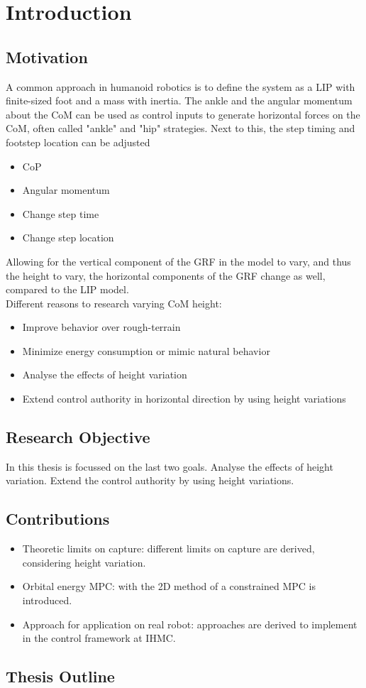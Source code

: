%
\chapter{Introduction} \label{chap::intro}
\section{Motivation}
A common approach in humanoid robotics is to define the system as a \ac{LIP} with finite-sized foot and a mass with inertia. The ankle and the angular momentum about the \ac{CoM} can be used as control inputs to generate horizontal forces on the \ac{CoM}, often called "ankle" and "hip" strategies.  Next to this, the step timing and footstep location can be adjusted
\begin{itemize}
	\item \ac{CoP}
	\item Angular momentum
	\item Change step time
	\item Change step location
\end{itemize}

Allowing for the vertical component of the \ac{GRF} in the model to vary, and thus the height to vary, the horizontal components of the \ac{GRF} change as well, compared to the \ac{LIP} model.\\
Different reasons to research varying \ac{CoM} height: 
\begin{itemize}
	\item Improve behavior over rough-terrain
	\item Minimize energy consumption or mimic natural behavior
	\item Analyse the effects of height variation
	\item Extend control authority in horizontal direction by using height variations
\end{itemize}





\section{Research Objective}
In this thesis is focussed on the last two goals. Analyse the effects of height variation. Extend the control authority by using height variations. 

\section{Contributions}
\begin{itemize}
	\item Theoretic limits on capture: different limits on capture are derived, considering height variation.
	\item Orbital energy \ac{MPC}: with the \ac{2D} method of \cite{koolen2016balance} a constrained \ac{MPC} is introduced.
	\item Approach for application on real robot: approaches are derived to implement in the control framework at IHMC.
\end{itemize}
\section{Thesis Outline}


